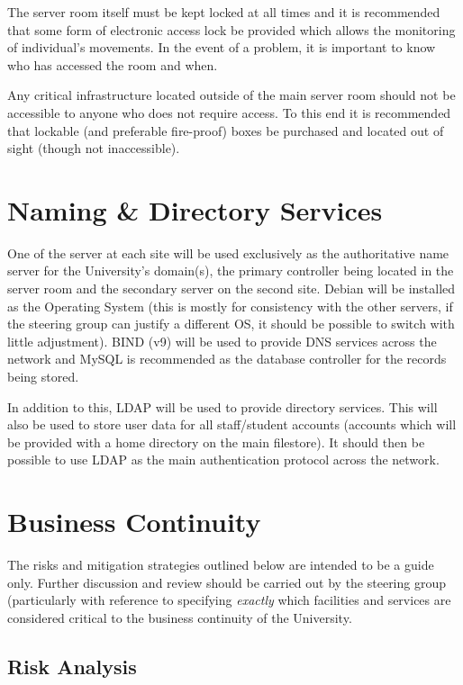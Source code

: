 \documentclass[a4paper, twoside]{article}
\begin{document}
The server room itself must be kept locked at all times and it is recommended
that some form of electronic access lock be provided which allows the monitoring
of individual's movements. In the event of a problem, it is important to know
who has accessed the room and when.

Any critical infrastructure located outside of the main server room should not
be accessible to anyone who does not require access. To this end it is
recommended that lockable (and preferable fire-proof) boxes be purchased and
located out of sight (though not inaccessible).

\section{Naming \& Directory Services}
\label{sec:nandd}
One of the server at each site will be used exclusively as the authoritative name server for
the University's domain(s), the primary controller being located in the server
room and the secondary server on the second site. Debian will be installed as the Operating System
(this is mostly for consistency with the other servers, if the steering group
can justify a different OS, it should be possible to switch with little
adjustment). BIND (v9) will be used to provide DNS services across the network
and MySQL is recommended as the database controller for the records being
stored.

In addition to this, LDAP will be used to provide directory services. This will
also be used to store user data for all staff/student accounts (accounts which
will be provided with a home directory on the main filestore). It should then be
possible to use LDAP as the main authentication protocol across the network.

\section{Business Continuity}
The risks and mitigation strategies outlined below are intended to be a guide
only. Further discussion and review should be carried out by the steering group
(particularly with reference to specifying \emph{exactly} which facilities and
services are considered critical to the business continuity of the University.

\subsection{Risk Analysis}
\end{document}
